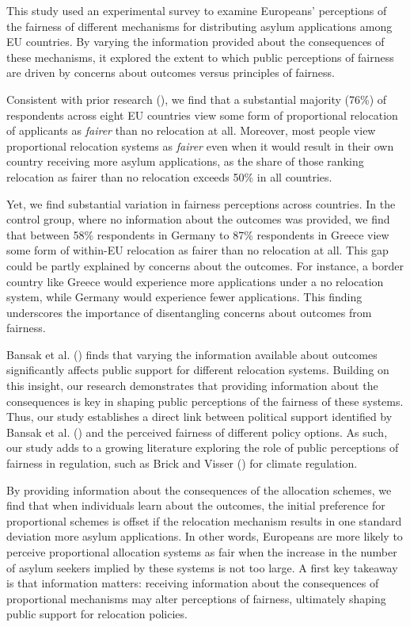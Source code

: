 \documentclass[
  12pt,
  a4paper,
]{article}
\begin{document}
This study used an experimental survey to examine Europeans' perceptions of the fairness of different mechanisms for distributing asylum applications among EU countries. By varying the information provided about the consequences of these mechanisms, it explored the extent to which public perceptions of fairness are driven by concerns about outcomes versus principles of fairness.

Consistent with prior research (), we find that a substantial majority (76\%) of respondents across eight EU countries view some form of proportional relocation of applicants as \emph{fairer} than no relocation at all. Moreover, most people view proportional relocation systems as \emph{fairer} even when it would result in their own country receiving more asylum applications, as the share of those ranking relocation as fairer than no relocation exceeds 50\% in all countries.

Yet, we find substantial variation in fairness perceptions across countries. In the control group, where no information about the outcomes was provided, we find that between 58\% respondents in Germany to 87\% respondents in Greece view some form of within-EU relocation as fairer than no relocation at all. This gap could be partly explained by concerns about the outcomes. For instance, a border country like Greece would experience more applications under a no relocation system, while Germany would experience fewer applications. This finding underscores the importance of disentangling concerns about outcomes from fairness.

Bansak et al. () finds that varying the information available about outcomes significantly affects public support for different relocation systems. Building on this insight, our research demonstrates that providing information about the consequences is key in shaping public perceptions of the fairness of these systems. Thus, our study establishes a direct link between political support identified by Bansak et al. () and the perceived fairness of different policy options. As such, our study adds to a growing literature exploring the role of public perceptions of fairness in regulation, such as Brick and Visser () for climate regulation.

By providing information about the consequences of the allocation schemes, we find that when individuals learn about the outcomes, the initial preference for proportional schemes is offset if the relocation mechanism results in one standard deviation more asylum applications. In other words, Europeans are more likely to perceive proportional allocation systems as fair when the increase in the number of asylum seekers implied by these systems is not too large. A first key takeaway is that information matters: receiving information about the consequences of proportional mechanisms may alter perceptions of fairness, ultimately shaping public support for relocation policies.
\end{document}
